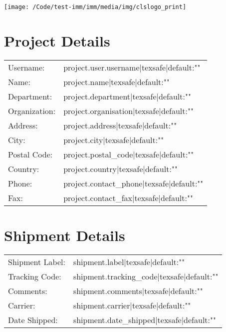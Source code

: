 \documentclass[6pt]{article}
\begin{document}
    \texttt{[image: /Code/test-imm/imm/media/img/clslogo\_print]}

	\section*{Project Details}
	
	\begin{tabular}{ll}
		Username: & {{ project.user.username|texsafe|default:"" }} \\
		Name: & {{ project.name|texsafe|default:"" }} \\
		Department: & {{ project.department|texsafe|default:"" }} \\
		Organization: & {{ project.organisation|texsafe|default:"" }} \\
		Address: & {{ project.address|texsafe|default:"" }} \\
		City: & {{ project.city|texsafe|default:"" }} \\
		Postal Code: & {{ project.postal_code|texsafe|default:"" }} \\
		Country: & {{ project.country|texsafe|default:"" }} \\
		Phone: & {{ project.contact_phone|texsafe|default:"" }} \\
		Fax: & {{ project.contact_fax|texsafe|default:"" }} \\
	\end{tabular}

	\section*{Shipment Details}

	\begin{tabular}{ll}
		Shipment Label: & {{ shipment.label|texsafe|default:"" }} \\
		Tracking Code: & {{ shipment.tracking_code|texsafe|default:"" }} \\
		Comments: & {{ shipment.comments|texsafe|default:"" }} \\
		Carrier: & {{ shipment.carrier|texsafe|default:"" }} \\
		Date Shipped: & {{ shipment.date_shipped|texsafe|default:"" }} \\
	\end{tabular}
	
\end{document}
